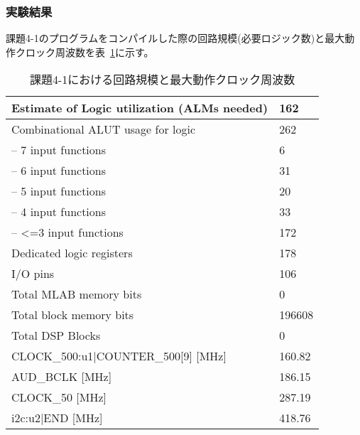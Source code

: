 \subsubsection{実験結果}
課題4-1のプログラムをコンパイルした際の回路規模(必要ロジック数)と最大動作クロック周波数を表~\ref{tab:basic4}に示す。
\begin{table}[h]
    \caption{課題4-1における回路規模と最大動作クロック周波数}\label{tab:basic4}
    \begin{center}
    \begin{tabular}{|l|l|}
    \hline
    Estimate of Logic utilization (ALMs needed) & 162    \\\hline
    Combinational ALUT usage for logic          & 262    \\\hline
    -- 7 input functions                        & 6      \\\hline
    -- 6 input functions                        & 31     \\\hline
    -- 5 input functions                        & 20     \\\hline
    -- 4 input functions                        & 33     \\\hline
    -- \textless{}=3 input functions            & 172    \\\hline
    Dedicated logic registers                   & 178    \\\hline
    I/O pins                                    & 106    \\\hline
    Total MLAB memory bits                      & 0      \\\hline
    Total block memory bits                     & 196608 \\\hline
    Total DSP Blocks                            & 0      \\\hline
    CLOCK\_500:u1|COUNTER\_500[9]	    [MHz] & 160.82 \\\hline
    AUD\_BCLK	    [MHz] & 186.15 \\\hline
    CLOCK\_50	    [MHz] & 287.19 \\\hline
    i2c:u2|END  [MHz] & 418.76 \\\hline
    \end{tabular}
    \end{center}
\end{table}